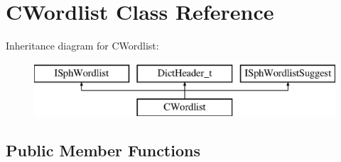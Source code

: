 \hypertarget{classCWordlist}{\section{C\-Wordlist Class Reference}
\label{classCWordlist}
}
Inheritance diagram for C\-Wordlist\-:\begin{figure}[H]
\begin{center}
\leavevmode
\includegraphics[height=2.000000cm]{classCWordlist}
\end{center}
\end{figure}
\subsection*{Public Member Functions}
